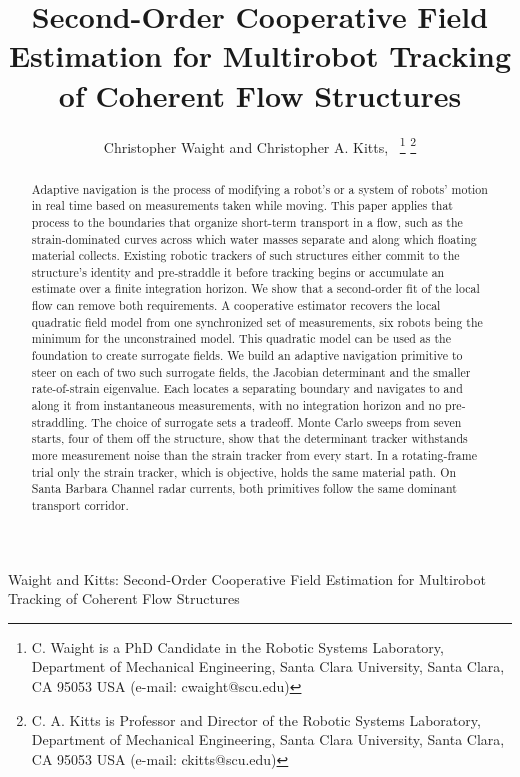\documentclass[lettersize,journal]{IEEEtran}
\begin{document}
\title{Second-Order Cooperative Field Estimation for
Multirobot Tracking of Coherent Flow Structures}

\author{Christopher Waight and Christopher A. Kitts,~
\thanks{C. Waight is a PhD Candidate in the Robotic Systems Laboratory, Department of Mechanical Engineering, Santa Clara University, Santa Clara, CA 95053 USA (e-mail: cwaight@scu.edu)}
\thanks{C. A. Kitts is Professor and Director of the Robotic Systems Laboratory, Department of Mechanical Engineering, Santa Clara University, Santa Clara, CA 95053 USA (e-mail: ckitts@scu.edu)}
}
%
{Waight and Kitts: Second-Order Cooperative Field Estimation for Multirobot Tracking of Coherent Flow Structures}

\maketitle

\begin{abstract}
Adaptive navigation is the process of modifying a robot's or a system of robots' motion in
real time based on measurements taken while moving. This paper applies
that process to the boundaries that organize short-term transport in a
flow, such as the strain-dominated curves across which water masses separate
and along which floating material collects. Existing robotic trackers
of such structures either commit to the structure's identity and pre-straddle it before
tracking begins or accumulate an estimate over a finite integration
horizon. We show that a second-order fit of the local flow can remove both
requirements. A cooperative estimator recovers the local quadratic field
model from one synchronized set of measurements, six robots being the minimum
for the unconstrained model. This quadratic model can be used as the foundation to create surrogate
fields. We build an adaptive navigation primitive to steer on each of two
such surrogate fields, the Jacobian determinant and the smaller
rate-of-strain eigenvalue. Each locates a separating boundary and navigates to and along
it from instantaneous measurements, with no integration horizon and no
pre-straddling. The choice of surrogate sets a tradeoff. Monte Carlo
sweeps from seven starts, four of them off the structure, show that the determinant tracker withstands
more measurement noise than the strain tracker from every start. In a rotating-frame trial only the strain
tracker, which is objective, holds the same material path. On Santa
Barbara Channel radar currents, both primitives follow the same dominant
transport corridor.

\end{abstract}
\end{document}
